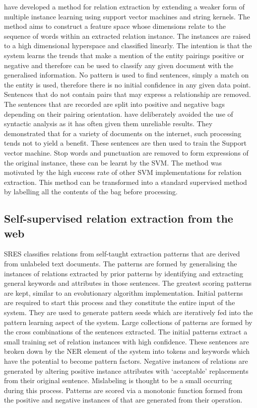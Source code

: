 \documentclass[12pt]{article} %
\begin{document}
\cite{learningExtraction} have developed a method for relation extraction by extending a weaker form of multiple instance learning using support vector machines and string kernels. The method aims to construct a feature space whose dimensions relate to the sequence of words within an extracted relation instance. The instances are raised to a high dimensional hyperspace and classified linearly. The intention is that the system learns the trends that make a mention of the entity pairings positive or negative and therefore can be used to classify any given document with the generalised information. No pattern is used to find sentences, simply a match on the entity is used, therefore there is no initial confidence in any given data point. Sentences that do not contain pairs that may express a relationship are removed. The sentences that are recorded are split into positive and negative bags depending on their pairing orientation. \cite{learningExtraction} have deliberately avoided the use of syntactic analysis as it has often given them unreliable results. They demonstrated that for a variety of documents on the internet, such processing tends not to yield a benefit. These sentences are then used to train the Support vector machine. Stop words and punctuation are removed to form expressions of the original instance, these can be learnt by the SVM. The method was motivated by the high success rate of other SVM implementations for relation extraction. This method can be transformed into a standard supervised method by labelling all the contents of the bag before processing.

\subsection{Self-supervised relation extraction from the web}

SRES classifies relations from self-taught extraction patterns that are derived from unlabeled text documents. The patterns are formed by generalising the instances of relations extracted by prior patterns by identifying and extracting general keywords and attributes in those sentences. The greatest scoring patterns are kept, similar to an evolutionary algorithm implementation. Initial patterns are required to start this process and they constitute the entire input of the system. They are used to generate pattern seeds which are iteratively fed into the pattern learning aspect of the system. Large collections of patterns are formed by the cross combinations of the sentences extracted. The initial patterns extract a small training set of relation instances with high confidence. These sentences are broken down by the NER element of the system into tokens and keywords which have the potential to become pattern factors. Negative instances of relations are generated by altering positive instance attributes with ‘acceptable’ replacements from their original sentence. Mislabeling is thought to be a small occurring during this process. Patterns are scored via a monotonic function formed from the positive and negative instances of that are generated from their operation.\\
\end{document}
